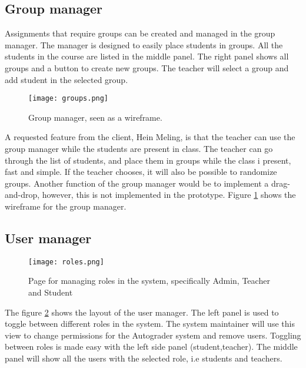 \subsection{Group manager}

Assignments that require groups can be created and managed in the group manager. The manager is designed to easily place students in groups. All the students in the course are listed in the middle panel. The right panel shows all groups and a button to create new groups. The teacher will select a group and add student in the selected group.

\begin{figure}[h!]
	 \centering
   \texttt{[image: groups.png]}
   \caption{Group manager, seen as a wireframe.}
   \label{fig:groupManager}
\end{figure}


A requested feature from the client, Hein Meling, is that the teacher can use the group manager while the students are present in class. The teacher can go through the list of students, and place them in groups while the class i present, fast and simple. If the teacher chooses, it will also be possible to randomize groups. Another function of the group manager would be to implement a drag-and-drop, however, this is not implemented in the prototype. Figure \ref{fig:groupManager} shows the wireframe for the group manager.

\subsection{User manager}

\begin{figure}[h!]
	 \centering
   \texttt{[image: roles.png]}
   \caption{Page for managing roles in the system, specifically Admin, Teacher and Student}
   \label{fig:userManager}
\end{figure}

The figure \ref{fig:userManager} shows the layout of the user manager. The left panel is used to toggle between different roles in the system. The system maintainer will use this view to change permissions for the Autograder system and remove users. Toggling between roles is made easy with the left side panel (student,teacher). The middle panel will show all the users with the selected role, i.e students and teachers.








